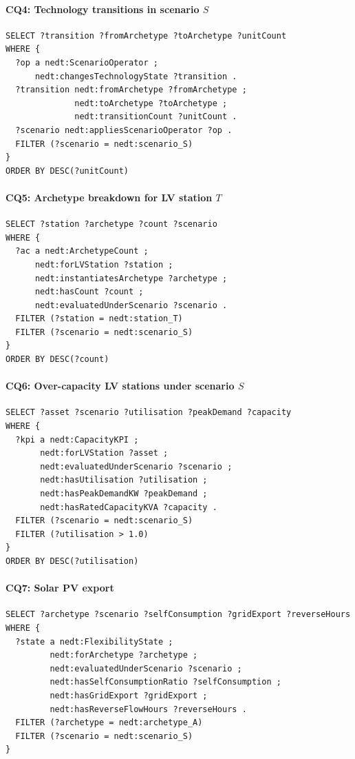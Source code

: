 \documentclass[preprint,12pt]{elsarticle}
\begin{document}
\paragraph{CQ4: Technology transitions in scenario $S$}
\begin{verbatim}
SELECT ?transition ?fromArchetype ?toArchetype ?unitCount
WHERE {
  ?op a nedt:ScenarioOperator ;
      nedt:changesTechnologyState ?transition .
  ?transition nedt:fromArchetype ?fromArchetype ;
              nedt:toArchetype ?toArchetype ;
              nedt:transitionCount ?unitCount .
  ?scenario nedt:appliesScenarioOperator ?op .
  FILTER (?scenario = nedt:scenario_S)
}
ORDER BY DESC(?unitCount)
\end{verbatim}

\paragraph{CQ5: Archetype breakdown for LV station $T$}
\begin{verbatim}
SELECT ?station ?archetype ?count ?scenario
WHERE {
  ?ac a nedt:ArchetypeCount ;
      nedt:forLVStation ?station ;
      nedt:instantiatesArchetype ?archetype ;
      nedt:hasCount ?count ;
      nedt:evaluatedUnderScenario ?scenario .
  FILTER (?station = nedt:station_T)
  FILTER (?scenario = nedt:scenario_S)
}
ORDER BY DESC(?count)
\end{verbatim}

\paragraph{CQ6: Over-capacity LV stations under scenario $S$}
\begin{verbatim}
SELECT ?asset ?scenario ?utilisation ?peakDemand ?capacity
WHERE {
  ?kpi a nedt:CapacityKPI ;
       nedt:forLVStation ?asset ;
       nedt:evaluatedUnderScenario ?scenario ;
       nedt:hasUtilisation ?utilisation ;
       nedt:hasPeakDemandKW ?peakDemand ;
       nedt:hasRatedCapacityKVA ?capacity .
  FILTER (?scenario = nedt:scenario_S)
  FILTER (?utilisation > 1.0)
}
ORDER BY DESC(?utilisation)
\end{verbatim}

\paragraph{CQ7: Solar PV export}
\begin{verbatim}
SELECT ?archetype ?scenario ?selfConsumption ?gridExport ?reverseHours
WHERE {
  ?state a nedt:FlexibilityState ;
         nedt:forArchetype ?archetype ;
         nedt:evaluatedUnderScenario ?scenario ;
         nedt:hasSelfConsumptionRatio ?selfConsumption ;
         nedt:hasGridExport ?gridExport ;
         nedt:hasReverseFlowHours ?reverseHours .
  FILTER (?archetype = nedt:archetype_A)
  FILTER (?scenario = nedt:scenario_S)
}
\end{verbatim}
\end{document}
